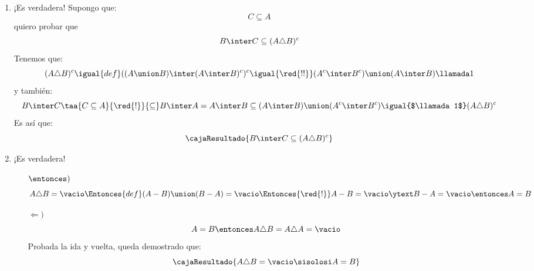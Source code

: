 \begin{enumerate}[label=\roman*)]
  \item ¡Es verdadera! Supongo que:
        $$
          C \subseteq A
        $$
        quiero probar que
        $$
          B \inter C \subseteq (A \triangle B)^c
        $$
        Tenemos que:
        $$
          (A \triangle B)^c \igual{def} ((A \union B) \inter (A \inter B)^c)^c
          \igual{\red{!!}} (A^c \inter B^c) \union (A \inter B) \llamada1
        $$
        y también:
        $$
          B \inter C \taa{C \subseteq A}{\red{!}}{\subseteq}
          B \inter A = A \inter B \subseteq (A \inter B) \union (A^c \inter B^c)
          \igual{$\llamada1$}
          (A \triangle B)^c
        $$
        Es así que:
        $$
          \cajaResultado{
            B \inter C \subseteq (A \triangle B)^c
          }
        $$

  \item\label{ej-13-1:itemiv} ¡Es verdadera!
        \begin{itemize}
          \item[$\entonces)$]
                $$
                  A \triangle B = \vacio
                  \Entonces{def}
                  (A - B) \union (B - A) = \vacio
                  \Entonces{\red{!}}
                  A - B = \vacio \ytext B - A = \vacio
                  \entonces
                  A = B
                $$

          \item[$\Leftarrow)$]
                $$
                  A = B \entonces A \triangle B = A \triangle A = \vacio
                $$
                Probada la ida y vuelta, queda demostrado que:
                $$
                  \cajaResultado{
                    A \triangle B = \vacio \sisolosi A = B
                  }
                $$
        \end{itemize}
\end{enumerate}

\begin{aportes}
  \item {}
  \item {}
\end{aportes}

